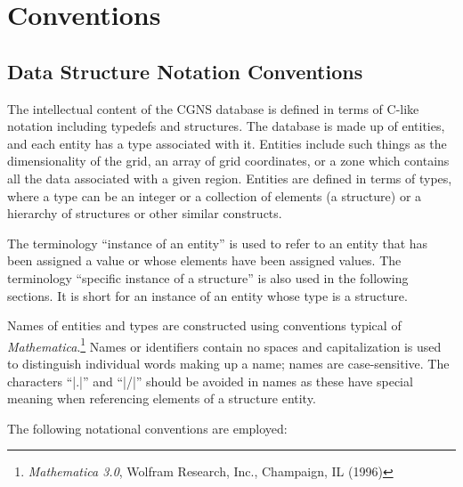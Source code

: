 \section{Conventions}
\label{s:conv}
\thispagestyle{plain}

\subsection{Data Structure Notation Conventions}
\label{s:conv_language}

The intellectual content of the CGNS database is defined in terms of
C-like notation including typedefs and structures.  The database is made
up of entities, and each entity has a type associated with it.  Entities
include such things as the dimensionality of the grid, an array of grid
coordinates, or a zone which contains all the data associated with a
given region.  Entities are defined in terms of types, where a type can
be an integer or a collection of elements (a structure) or a hierarchy
of structures or other similar constructs.

The terminology ``instance of an entity'' is used to refer to an entity
that has been assigned a value or whose elements have been assigned
values.  The terminology ``specific instance of a structure'' is also used
in the following sections.  It is short for an instance of an entity
whose type is a structure.

Names of entities and types are constructed using conventions typical
of \textit{Mathematica}.\footnote{\textit{Mathematica 3.0}, Wolfram Research,
Inc., Champaign, IL (1996)}
Names or identifiers contain no spaces and capitalization is used to
distinguish individual words making up a name; names are case-sensitive.
The characters ``|.|'' and ``|/|'' should be avoided in names as these have
special meaning when referencing elements of a structure entity.

The following notational conventions are employed:

